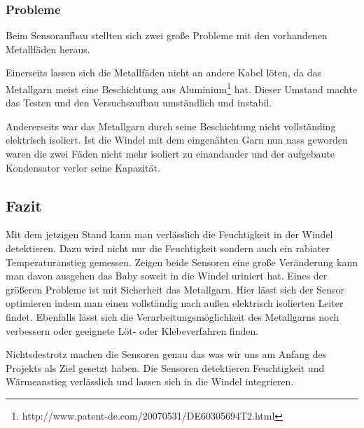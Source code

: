 \subsubsection{Probleme}
\label{subsubsec:sensor_probleme}
Beim Sensoraufbau stellten sich zwei große Probleme mit den vorhandenen Metallfäden heraus.

Einerseits lassen sich die Metallfäden nicht an andere Kabel löten, da das Metallgarn meist eine Beschichtung aus Aluminium\footnote{http://www.patent-de.com/20070531/DE60305694T2.html} hat. Dieser Umstand machte das Testen und den Versuchsaufbau umständlich und instabil.

Andererseits war das Metallgarn durch seine Beschichtung nicht vollständing elektrisch isoliert. Ist die Windel mit dem eingenähten Garn nun nass geworden waren die zwei Fäden nicht mehr isoliert zu einandander und der aufgebaute Kondensator verlor seine Kapazität. 

\subsection{Fazit}
Mit dem jetzigen Stand kann man verlässlich die Feuchtigkeit in der Windel detektieren. Dazu wird nicht nur die Feuchtigkeit sondern auch ein rabiater Temperaturanstieg gemessen. Zeigen beide Sensoren eine große Veränderung kann man davon ausgehen das Baby soweit in die Windel uriniert hat. 
Eines der größeren Probleme ist mit Sicherheit das Metallgarn. Hier lässt sich der Sensor optimieren indem man einen vollständig nach außen elektrisch isolierten Leiter findet. Ebenfalls lässt sich die Verarbeitungsmöglichkeit des Metallgarns noch verbessern oder geeignete Löt- oder Klebeverfahren finden.

Nichtsdestrotz machen die Sensoren genau das was wir uns am Anfang des Projekts als Ziel gesetzt haben. Die Sensoren detektieren Feuchtigkeit und Wärmeanstieg verlässlich und lassen sich in die Windel integrieren. 

\pagebreak
